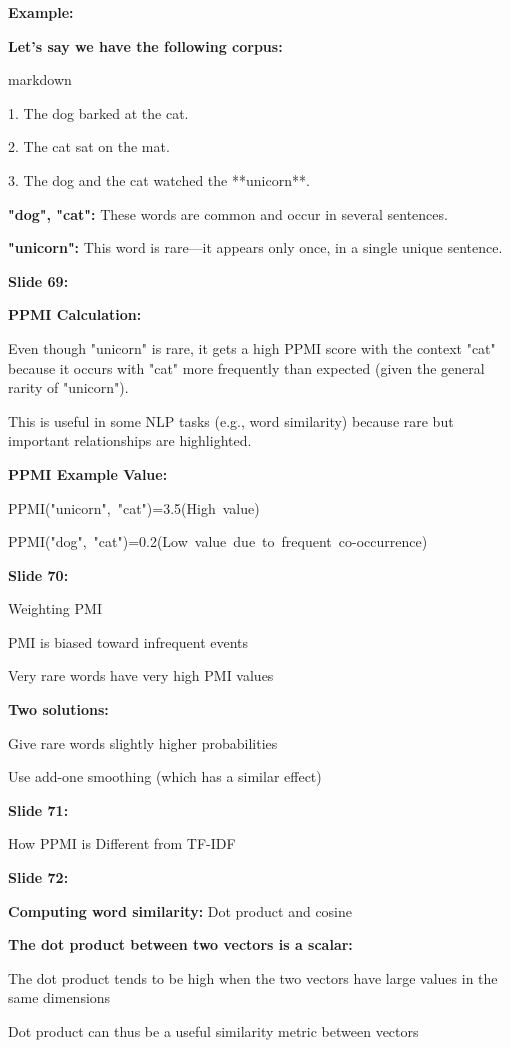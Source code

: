 \documentclass[11pt,a4paper]{article}
\begin{document}
\textbf{Example:} 

\textbf{Let’s say we have the following corpus:} 

markdown

1. The dog barked at the cat.

2. The cat sat on the mat.

3. The dog and the cat watched the **unicorn**.

\textbf{"dog", "cat":}  These words are common and occur in several sentences.

\textbf{"unicorn":}  This word is rare—it appears only once, in a single unique sentence.

\textbf{Slide 69:}

\textbf{PPMI Calculation:} ​

Even though "unicorn" is rare, it gets a high PPMI score with the context "cat" because it occurs with "cat" more frequently than expected (given the general rarity of "unicorn").​

This is useful in some NLP tasks (e.g., word similarity) because rare but important relationships are highlighted.​

\textbf{PPMI Example Value:} ​

PPMI("unicorn", "cat")=3.5(High value)

PPMI("dog", "cat")=0.2(Low value due to frequent co-occurrence)

\textbf{Slide 70:}

Weighting PMI

PMI is biased toward infrequent events

Very rare words have very high PMI values

\textbf{Two solutions:} 

Give rare words slightly higher probabilities

Use add-one smoothing (which has a similar effect)

\textbf{Slide 71:}

How PPMI is Different from TF-IDF

\textbf{Slide 72:}

\textbf{Computing word similarity:}  Dot product and cosine

\textbf{The dot product between two vectors is a scalar:} 

The dot product tends to be high when the two vectors have large values in the same dimensions

Dot product can thus be a useful similarity metric between vectors
\end{document}
